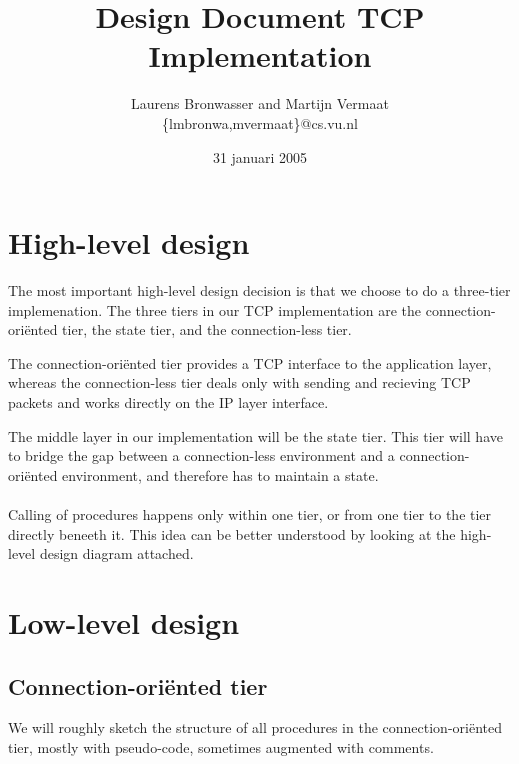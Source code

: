 \documentclass[11pt]{article}
\title{Design Document TCP Implementation}
\author{
    Laurens Bronwasser and Martijn Vermaat\\
    \{lmbronwa,mvermaat\}@cs.vu.nl
}
\date{31 januari 2005}
\begin{document}
\maketitle


\lstset{
  numbers=none,
  basicstyle=\small,
  frame=tb,
  language=C,
  captionpos=b
}


\section{High-level design}


The most important high-level design decision is that we choose to do a
three-tier implemenation. The three tiers in our TCP implementation are
the connection-ori\"ented tier, the state tier, and the connection-less
tier.

The connection-ori\"ented tier provides a TCP interface to the application
layer, whereas the connection-less tier deals only with sending and
recieving TCP packets and works directly on the IP layer interface.

The middle layer in our implementation will be the state tier. This tier
will have to bridge the gap between a connection-less environment and a
connection-ori\"ented environment, and therefore has to maintain a state.

\paragraph{}

Calling of procedures happens only within one tier, or from one tier to
the tier directly beneeth it. This idea can be better understood by
looking at the high-level design diagram attached.


\section{Low-level design}


\subsection{Connection-ori\"ented tier}


We will roughly sketch the structure of all procedures in the
connection-ori\"ented tier, mostly with pseudo-code, sometimes
augmented with comments.


\paragraph{}
\end{document}
